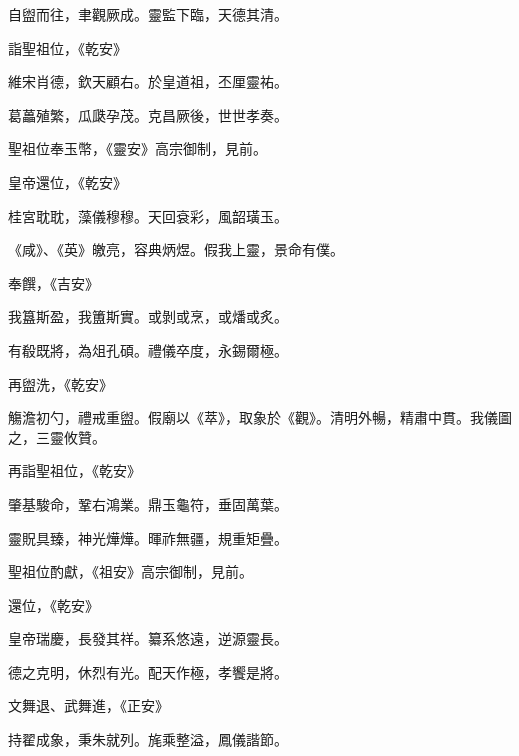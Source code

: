 \begin{pinyinscope}
 自盥而往，聿觀厥成。靈監下臨，天德其清。



 詣聖祖位，《乾安》



 維宋肖德，欽天顧右。於皇道祖，丕厘靈祐。



 葛藟殖繁，瓜瓞孕茂。克昌厥後，世世孝奏。



 聖祖位奉玉幣，《靈安》高宗御制，見前。



 皇帝還位，《乾安》



 桂宮耽耽，藻儀穆穆。天回袞彩，風韶璜玉。



 《咸》、《英》皦亮，容典炳煜。假我上靈，景命有僕。



 奉饌，《吉安》



 我簋斯盈，我簠斯實。或剝或烹，或燔或炙。



 有殽既將，為俎孔碩。禮儀卒度，永錫爾極。



 再盥洗，《乾安》



 觴澹初勺，禮戒重盥。假廟以《萃》，取象於《觀》。清明外暢，精肅中貫。我儀圖之，三靈攸贊。



 再詣聖祖位，《乾安》



 肇基駿命，鞏右鴻業。鼎玉龜符，垂固萬葉。



 靈貺具臻，神光燁燁。暉祚無疆，規重矩疊。



 聖祖位酌獻，《祖安》高宗御制，見前。



 還位，《乾安》



 皇帝瑞慶，長發其祥。纂系悠遠，逆源靈長。



 德之克明，休烈有光。配天作極，孝饗是將。



 文舞退、武舞進，《正安》



 持翟成象，秉朱就列。旄乘整溢，鳳儀諧節。




\end{pinyinscope}
